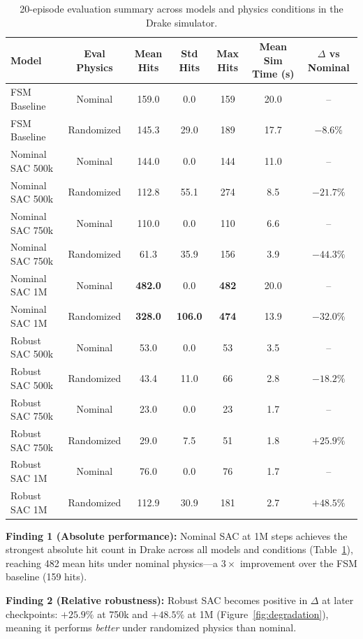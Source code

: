 \documentclass[10pt,twocolumn,letterpaper]{article}
\begin{document}
\begin{table}[t]
\centering
\caption{20-episode evaluation summary across models and physics conditions in the Drake simulator.}
\label{tab:main_results}
\small
\begin{tabular}{lcccccc}
\toprule
Model & Eval Physics & Mean Hits & Std Hits & Max Hits & Mean Sim Time (s) & $\Delta$ vs Nominal \\
\midrule
FSM Baseline & Nominal & 159.0 & 0.0 & 159 & 20.0 & -- \\
FSM Baseline & Randomized & 145.3 & 29.0 & 189 & 17.7 & $-8.6\%$ \\
\midrule
Nominal SAC 500k & Nominal & 144.0 & 0.0 & 144 & 11.0 & -- \\
Nominal SAC 500k & Randomized & 112.8 & 55.1 & 274 & 8.5 & $-21.7\%$ \\
Nominal SAC 750k & Nominal & 110.0 & 0.0 & 110 & 6.6 & -- \\
Nominal SAC 750k & Randomized & 61.3 & 35.9 & 156 & 3.9 & $-44.3\%$ \\
Nominal SAC 1M & Nominal & \textbf{482.0} & 0.0 & \textbf{482} & 20.0 & -- \\
Nominal SAC 1M & Randomized & \textbf{328.0} & \textbf{106.0} & \textbf{474} & 13.9 & $-32.0\%$ \\
\midrule
Robust SAC 500k & Nominal & 53.0 & 0.0 & 53 & 3.5 & -- \\
Robust SAC 500k & Randomized & 43.4 & 11.0 & 66 & 2.8 & $-18.2\%$ \\
Robust SAC 750k & Nominal & 23.0 & 0.0 & 23 & 1.7 & -- \\
Robust SAC 750k & Randomized & 29.0 & 7.5 & 51 & 1.8 & $+25.9\%$ \\
Robust SAC 1M & Nominal & 76.0 & 0.0 & 76 & 1.7 & -- \\
Robust SAC 1M & Randomized & 112.9 & 30.9 & 181 & 2.7 & $+48.5\%$ \\
\bottomrule
\end{tabular}
\end{table}

\textbf{Finding 1 (Absolute performance):}
Nominal SAC at 1M steps achieves the strongest absolute hit count in Drake across all models and conditions (Table~\ref{tab:main_results}), reaching 482 mean hits under nominal physics---a $3\times$ improvement over the FSM baseline (159 hits).

\textbf{Finding 2 (Relative robustness):}
Robust SAC becomes positive in $\Delta$ at later checkpoints: $+25.9\%$ at 750k and $+48.5\%$ at 1M (Figure~\ref{fig:degradation}), meaning it performs \emph{better} under randomized physics than nominal.
\end{document}
